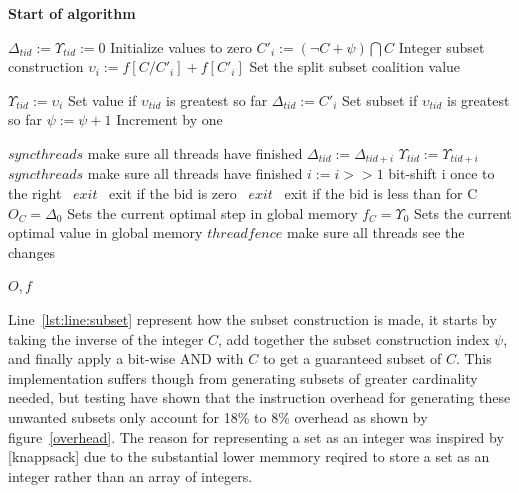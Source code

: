 \documentclass[a4paper, 12pt]{report}
\begin{document}
\textbf{Start of algorithm}
\begin{algorithmic}[1]
\STATE $\Delta _{tid} := \Upsilon _{tid} := 0$ \hfill Initialize values to zero
\IF{$\psi \leq \Psi$} 
\STATE $C'_{i} := (\neg C+\psi) \bigcap C$ \label{lst:line:subset} \hfill Integer subset construction
\STATE $\upsilon _{i} := f[C/C'_{i}]+f[C'_{i}]$ \hfill Set the split subset coalition value
\ENDIF 

\STATE $\Upsilon _{tid} := \upsilon _{i}$  \hfill Set value if $\upsilon _{tid}$ is greatest so far
\STATE $\Delta _{tid} := C'_{i}$ \hfill Set subset if $\upsilon _{tid}$ is greatest so far
\ENDIF
\STATE $\psi := \psi + 1$ \hfill Increment by one
\ENDFOR
\ENDIF

\STATE $syncthreads$ \hfill make sure all threads have finished
 \label{lst:line:mid}
 \label{lst:line:midmid}
 \label{lst:line:midmidmid}
\STATE $\Delta _{tid} := \Delta _{tid+i}$ 
\STATE $\Upsilon _{tid} := \Upsilon _{tid+i}$
\ENDIF
\ENDIF
\STATE $syncthreads$ \hfill make sure all threads have finished
\STATE $i := i >> 1$ \hfill bit-shift i once to the right \label{lst:line:midlast}
\ENDFOR \label{lst:line:midend}
 \label{lst:line:last}
\STATE{} \algorithmicthen\ {$ exit$}
\algorithmicend\ \algorithmicif \hfill exit if the bid is zero
\STATE{} \algorithmicthen\ {$ exit$} 
\algorithmicend\ \algorithmicif \hfill exit if the bid is less than for C
  \label{lst:line:lastmid}
\STATE $O_C = \Delta _0$ \hfill Sets the current optimal step in global memory
\STATE $f_C = \Upsilon _0$ \hfill Sets the current optimal value in global memory
\STATE $threadfence$ \hfill make sure all threads see the changes
\ENDIF 

\ENDIF \label{lst:line:lastend}
\RETURN $O,f$
\end{algorithmic}
Line~\ref{lst:line:subset} represent how the subset construction is made, it starts by taking the inverse of the integer $C$, add together the subset construction index $\psi$, and finally apply a bit-wise AND with $C$ to get a guaranteed subset of $C$. This implementation suffers though from generating subsets of greater cardinality needed, but testing have shown that the instruction overhead for generating these unwanted subsets only account for 18\% to 8\% overhead as shown by figure~\ref{overhead}. The reason for representing a set as an integer was inspired by [knappsack] due to the substantial lower memmory reqired to store a set as an integer rather than an array of integers.\\ 
\end{document}
